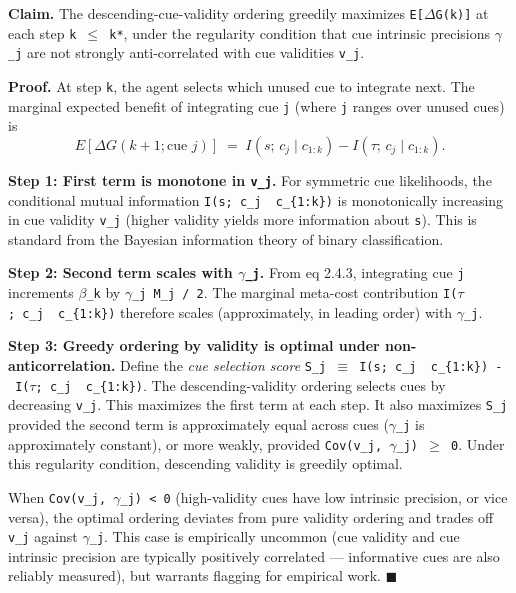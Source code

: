 \documentclass{article}
\begin{document}
\textbf{Claim.} The descending-cue-validity ordering greedily maximizes
\texttt{E{[}\ensuremath{\Delta}G(k){]}} at each step \texttt{k\ \ensuremath{\leq}\ k*}, under the
regularity condition that cue intrinsic precisions \texttt{\ensuremath{\gamma}\_j} are not
strongly anti-correlated with cue validities \texttt{v\_j}.

\textbf{Proof.} At step \texttt{k}, the agent selects which unused cue
to integrate next. The marginal expected benefit of integrating cue
\texttt{j} (where \texttt{j} ranges over unused cues) is \[
E[\Delta G(k+1; \text{cue } j)] \;=\; I(s;\, c_j \mid c_{1:k}) - I(\tau;\, c_j \mid c_{1:k}).
\]

\textbf{Step 1: First term is monotone in \texttt{v\_j}.} For symmetric
cue likelihoods, the conditional mutual information
\texttt{I(s;\ c\_j\ \textbar{}\ c\_\{1:k\})} is monotonically increasing
in cue validity \texttt{v\_j} (higher validity yields more information
about \texttt{s}). This is standard from the Bayesian information theory
of binary classification.

\textbf{Step 2: Second term scales with \texttt{\ensuremath{\gamma}\_j}.} From eq 2.4.3,
integrating cue \texttt{j} increments \texttt{\ensuremath{\beta}\_k} by
\texttt{\ensuremath{\gamma}\_j\ M\_j\ /\ 2}. The marginal meta-cost contribution
\texttt{I(\ensuremath{\tau};\ c\_j\ \textbar{}\ c\_\{1:k\})} therefore scales
(approximately, in leading order) with \texttt{\ensuremath{\gamma}\_j}.

\textbf{Step 3: Greedy ordering by validity is optimal under
non-anticorrelation.} Define the \emph{cue selection score}
\texttt{S\_j\ \ensuremath{\equiv}\ I(s;\ c\_j\ \textbar{}\ c\_\{1:k\})\ -\ I(\ensuremath{\tau};\ c\_j\ \textbar{}\ c\_\{1:k\})}.
The descending-validity ordering selects cues by decreasing
\texttt{v\_j}. This maximizes the first term at each step. It also
maximizes \texttt{S\_j} provided the second term is approximately equal
across cues (\texttt{\ensuremath{\gamma}\_j} is approximately constant), or more weakly,
provided \texttt{Cov(v\_j,\ \ensuremath{\gamma}\_j)\ \ensuremath{\geq}\ 0}. Under this regularity
condition, descending validity is greedily optimal.

When \texttt{Cov(v\_j,\ \ensuremath{\gamma}\_j)\ \textless{}\ 0} (high-validity cues have
low intrinsic precision, or vice versa), the optimal ordering deviates
from pure validity ordering and trades off \texttt{v\_j} against
\texttt{\ensuremath{\gamma}\_j}. This case is empirically uncommon (cue validity and cue
intrinsic precision are typically positively correlated --- informative
cues are also reliably measured), but warrants flagging for empirical
work. \ensuremath{\blacksquare}
\end{document}
